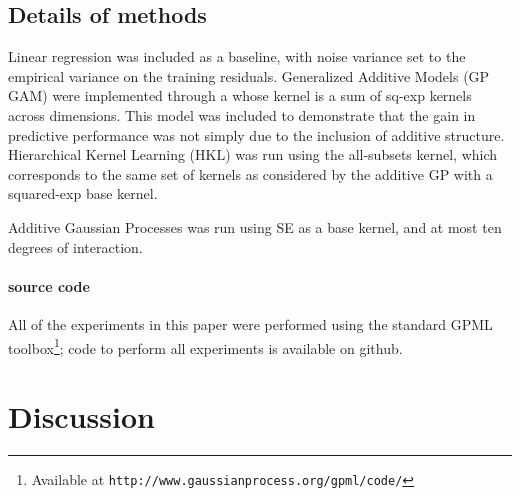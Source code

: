 \documentclass[twoside]{article}
\begin{document}
\subsection{Details of methods}

Linear regression was included as a baseline, with noise variance set to the empirical variance on the training residuals.
%
Generalized Additive Models (GP GAM) were implemented through a \gp{} whose kernel is a sum of sq-exp kernels across dimensions.
This model was included to demonstrate that the gain in predictive performance was not simply due to the inclusion of additive structure.
%
Hierarchical Kernel Learning (HKL)
was run using the all-subsets kernel, which corresponds to the same set of kernels as considered by the additive GP with a squared-exp base kernel.

Additive Gaussian Processes was run using SE as a base kernel, and at most ten degrees of interaction.

\paragraph{source code}All of the experiments in this paper were performed using the standard GPML toolbox\footnote{Available at \texttt{http://www.gaussianprocess.org/gpml/code/}}; code to perform all experiments is available on github.





\section{Discussion}
\end{document}
